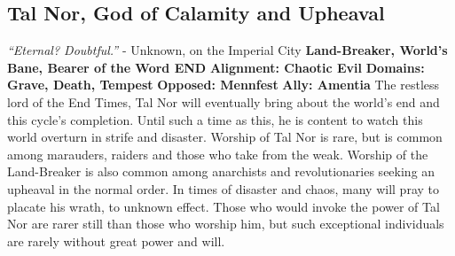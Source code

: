 \subsection{Tal Nor, God of Calamity and Upheaval}\label{god:talnor}
\textit{“Eternal? Doubtful.”}
\break
\hspace*{\fill}- Unknown, on the Imperial City
\break
\break
\textbf{Land-Breaker, World’s Bane, Bearer of the Word END}\break
\hspace*{\fill}\break
\textbf{Alignment:\hspace*{\fill} Chaotic Evil} \break
\textbf{Domains:\hspace*{\fill} Grave, Death, Tempest} \break
\textbf{Opposed:\hspace*{\fill} Mennfest} \break
\textbf{Ally:\hspace*{\fill} Amentia} \break
\hspace*{\fill}\break
The restless lord of the End Times, Tal Nor will eventually bring about the world’s end and this cycle’s completion. Until such a time as this, he is content to watch this world overturn in strife and disaster.\newline
Worship of Tal Nor is rare, but is common among marauders, raiders and those who take from the weak. Worship of the Land-Breaker is also common among anarchists and revolutionaries seeking an upheaval in the normal order. In times of disaster and chaos, many will pray to placate his wrath, to unknown effect.\newline
Those who would invoke the power of Tal Nor are rarer still than those who worship him, but such exceptional individuals are rarely without great power and will.   
